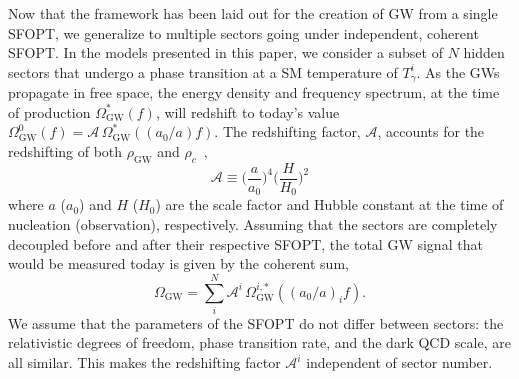 \documentclass[nofootinbib,twocolumn,preprintnumbers]{revtex4-1}
\begin{document}
Now that the framework has been laid out for the creation of GW from a single SFOPT, we generalize to multiple sectors going under independent, coherent SFOPT. In the models presented in this paper, we consider a subset of $N$ hidden sectors that undergo a phase transition at a SM temperature of $T_{\gamma}^{i}$. As the GWs propagate in free space, the energy density and frequency spectrum, at the time of production $\Omega_{\textrm{GW}}^{*}(f)$, will redshift to today's value $\Omega_{\textrm{GW}}^{0}(f) = \mathcal{A}\, \Omega_{\textrm{GW}}^{*}((a_{0}/a) f) $. The redshifting factor, $\mathcal{A}$, accounts for the redshifting of both $\rho_{\textrm{GW}} $ and $\rho_{c}$~\cite{Breitbach:2018ddu,PhysRevD.49.2837},
\begin{equation}\label{eqn::redshifting}
\mathcal{A} \equiv \bigg( \frac{a}{a_{0}} \bigg)^4 \bigg( \frac{H}{H_{0}}\bigg)^2
\end{equation}
where $a$ ($a_{0}$)  and $H$ ($H_{0}$) are the scale factor and Hubble constant at the time of nucleation (observation), respectively. Assuming that the sectors are completely decoupled before and after their respective SFOPT, the total GW signal that would be measured today is given by the coherent sum,
\begin{equation}
\Omega_{\textrm{GW}} =  \sum_{i}^{N} \mathcal{A}^{i}\, \Omega_{\textrm{GW}}^{i,*}((a_{0}/a)_{i} f) .
\end{equation}
We assume that the parameters of the SFOPT do not differ between sectors: the relativistic degrees of freedom, phase transition rate, and the dark QCD scale, are all similar. This makes the redshifting factor $\mathcal{A}^i$ independent of sector number.
\end{document}
